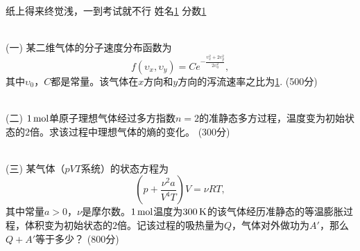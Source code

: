 \documentclass[12pt,CJK]{article}
\def\mark#1{{\color{blue} (#1分)}}
\begin{document}
\bch


{\blue 纸上得来终觉浅，一到考试就不行} {} 姓名\uline{1} {\hskip 0.5in} 分数\uline{1}

{\vskip 0.3in}
\ \\
(一) 某二维气体的分子速度分布函数为
$$f(\upsilon_x, \upsilon_y) = C e^{-\frac{\upsilon_x^2+2\upsilon_y^2}{2\upsilon_0^2}}, $$  
其中$\upsilon_0$，$C$都是常量。该气体在$x$方向和$y$方向的泻流速率之比为\uline{1}. \mark{500}

{\vskip 0.1in}
\ \\
(二) $1\,\mathrm{mol}$单原子理想气体经过多方指数$n=2$的准静态多方过程，温度变为初始状态的$2$倍。求该过程中理想气体的熵的变化。 \mark{300}

{\vskip 2.5in}
\ \\
(三) 某气体（$pVT$系统）的状态方程为
$$\left(p+\frac{\nu^2 a}{V^4T}\right)V = \nu R T,$$
其中常量$a>0$，$\nu$是摩尔数。$1\,\mathrm{mol}$温度为$300\,\mathrm{K}$的该气体经历准静态的等温膨胀过程，体积变为初始状态的$2$倍。记该过程的吸热量为$Q$，气体对外做功为$A'$，那么$Q+A'$等于多少？\mark{800}



\ech
\end{document}
